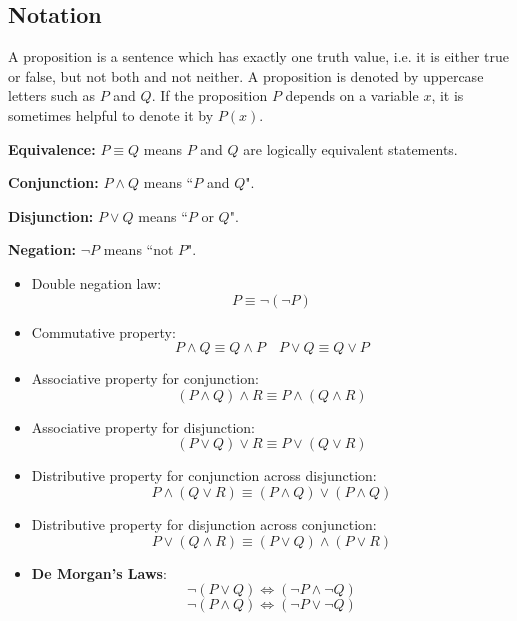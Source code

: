 \subsection{Notation}
A proposition is a sentence which has exactly one truth value, i.e. it is either true or false, but not both and not neither. A proposition is denoted by uppercase letters such as $P$ and $Q$. If the proposition $P$ depends on a variable $x$, it is sometimes helpful to denote it by $P(x)$. 

\textbf{Equivalence:} $P \equiv Q$ means $P$ and $Q$ are logically equivalent statements.

\textbf{Conjunction:} $P \land Q$ means ``$P$ and $Q$".

\textbf{Disjunction:} $P \lor Q$ means ``$P$ or $Q$".

\textbf{Negation:} $\lnot P$ means ``not $P$".

\begin{itemize}
\item Double negation law:
\[ P \equiv \lnot(\lnot P) \]

\item Commutative property:
\[ P \land Q \equiv Q \land P \quad P \lor Q \equiv Q \lor P \]

\item Associative property for conjunction: 
\[ (P\land Q)\land R \equiv P\land (Q\land R) \]

\item Associative property for disjunction: 
\[ (P\lor Q)\lor R \equiv P\lor (Q\lor R) \]

\item Distributive property for conjunction across disjunction: 
\[ P\land(Q\lor R) \equiv (P\land Q)\lor(P\land Q) \]

\item Distributive property for disjunction across conjunction: 
\[ P\lor(Q\land R) \equiv (P\lor Q)\land(P\lor R) \]

\item \textbf{De Morgan's Laws}:
\[ \lnot(P \lor Q) \iff (\lnot P \land \lnot Q) \]
\[ \lnot (P\land Q) \iff (\lnot P\lor \lnot Q) \]
\end{itemize}

